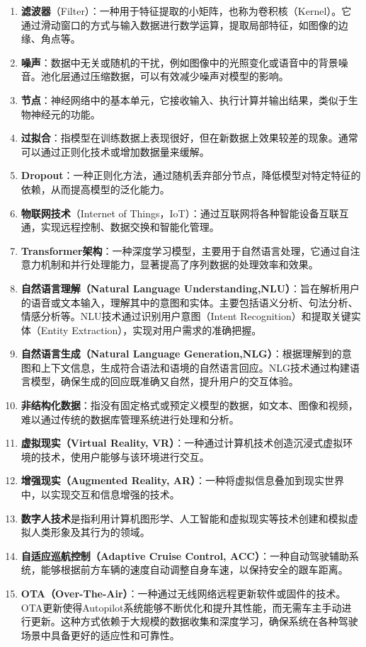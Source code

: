 \begin{enumerate}
\item \textbf{滤波器}（Filter）：一种用于特征提取的小矩阵，也称为卷积核（Kernel）。它通过滑动窗口的方式与输入数据进行数学运算，提取局部特征，如图像的边缘、角点等。
\item \textbf{噪声}：数据中无关或随机的干扰，例如图像中的光照变化或语音中的背景噪音。池化层通过压缩数据，可以有效减少噪声对模型的影响。
\item \textbf{节点}：神经网络中的基本单元，它接收输入、执行计算并输出结果，类似于生物神经元的功能。
\item \textbf{过拟合}：指模型在训练数据上表现很好，但在新数据上效果较差的现象。通常可以通过正则化技术或增加数据量来缓解。
\item \textbf{Dropout}：一种正则化方法，通过随机丢弃部分节点，降低模型对特定特征的依赖，从而提高模型的泛化能力。
\item \textbf{物联网技术}（Internet of Things，IoT）：通过互联网将各种智能设备互联互通，实现远程控制、数据交换和智能化管理。
\item \textbf{Transformer架构}：一种深度学习模型，主要用于自然语言处理，它通过自注意力机制和并行处理能力，显著提高了序列数据的处理效率和效果。
\item \textbf{自然语言理解（Natural Language Understanding,NLU）}：旨在解析用户的语音或文本输入，理解其中的意图和实体。主要包括语义分析、句法分析、情感分析等。NLU技术通过识别用户意图（Intent Recognition）和提取关键实体（Entity Extraction），实现对用户需求的准确把握。
\item \textbf{自然语言生成（Natural Language Generation,NLG）}：根据理解到的意图和上下文信息，生成符合语法和语境的自然语言回应。NLG技术通过构建语言模型，确保生成的回应既准确又自然，提升用户的交互体验。
\item \textbf{非结构化数据}：指没有固定格式或预定义模型的数据，如文本、图像和视频，难以通过传统的数据库管理系统进行处理和分析。
\item \textbf{虚拟现实（Virtual Reality, VR）}：一种通过计算机技术创造沉浸式虚拟环境的技术，使用户能够与该环境进行交互。
\item \textbf{增强现实（Augmented Reality, AR）}：一种将虚拟信息叠加到现实世界中，以实现交互和信息增强的技术。
\item \textbf{数字人技术}是指利用计算机图形学、人工智能和虚拟现实等技术创建和模拟虚拟人类形象及其行为的领域。
\item \textbf{自适应巡航控制（Adaptive Cruise Control, ACC）}：一种自动驾驶辅助系统，能够根据前方车辆的速度自动调整自身车速，以保持安全的跟车距离。
\item \textbf{OTA（Over-The-Air）}：一种通过无线网络远程更新软件或固件的技术。OTA更新使得Autopilot系统能够不断优化和提升其性能，而无需车主手动进行更新。这种方式依赖于大规模的数据收集和深度学习，确保系统在各种驾驶场景中具备更好的适应性和可靠性。

\end{enumerate}
